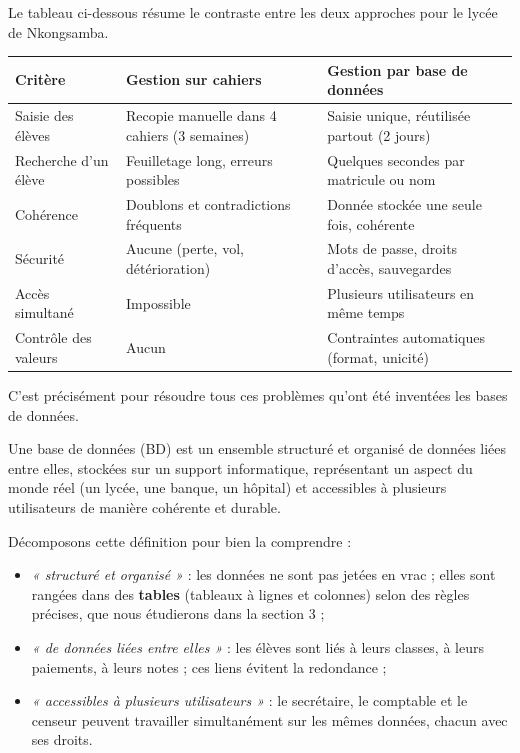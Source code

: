 \documentclass[11pt]{article}
\newcommand{\cle}[1]{{\popxbold\color{popdark}#1}}
\newcounter{popsec}
\newcounter{popsub}
\newcommand{\courssub}[1]{%
  \stepcounter{popsub}%
  \par\vspace{9pt}\noindent{\popxbold\fontsize{11.5}{13}\selectfont\color{popink}{\color{poporange}\thepopsec.\thepopsub}\hspace{6pt}#1}\par\nopagebreak\vspace{4pt}
}
\begin{document}
\begin{exemplebox}
Le tableau ci-dessous résume le contraste entre les deux approches pour le lycée de Nkongsamba.
\begin{center}
\begin{tabularx}{\linewidth}{|l|X|X|}
\hline
\rowcolor{popblueL} \textbf{Critère} & \textbf{Gestion sur cahiers} & \textbf{Gestion par base de données} \\
\hline
Saisie des élèves & Recopie manuelle dans 4 cahiers (3 semaines) & Saisie unique, réutilisée partout (2 jours) \\
\hline
Recherche d'un élève & Feuilletage long, erreurs possibles & Quelques secondes par matricule ou nom \\
\hline
Cohérence & Doublons et contradictions fréquents & Donnée stockée une seule fois, cohérente \\
\hline
Sécurité & Aucune (perte, vol, détérioration) & Mots de passe, droits d'accès, sauvegardes \\
\hline
Accès simultané & Impossible & Plusieurs utilisateurs en même temps \\
\hline
Contrôle des valeurs & Aucun & Contraintes automatiques (format, unicité) \\
\hline
\end{tabularx}
\end{center}
\end{exemplebox}

C'est précisément pour résoudre tous ces problèmes qu'ont été inventées les bases de données.

\courssub{La notion de base de données}

\begin{definition}
Une \cle{base de données} (BD) est un ensemble structuré et organisé de données liées entre elles, stockées sur un support informatique, représentant un aspect du monde réel (un lycée, une banque, un hôpital) et accessibles à plusieurs utilisateurs de manière cohérente et durable.
\end{definition}

Décomposons cette définition pour bien la comprendre :
\begin{itemize}
  \item \emph{« structuré et organisé »} : les données ne sont pas jetées en vrac ; elles sont rangées dans des \textbf{tables} (tableaux à lignes et colonnes) selon des règles précises, que nous étudierons dans la section 3 ;
  \item \emph{« de données liées entre elles »} : les élèves sont liés à leurs classes, à leurs paiements, à leurs notes ; ces liens évitent la redondance ;
  \item \emph{« accessibles à plusieurs utilisateurs »} : le secrétaire, le comptable et le censeur peuvent travailler simultanément sur les mêmes données, chacun avec ses droits.
\end{itemize}
\end{document}
